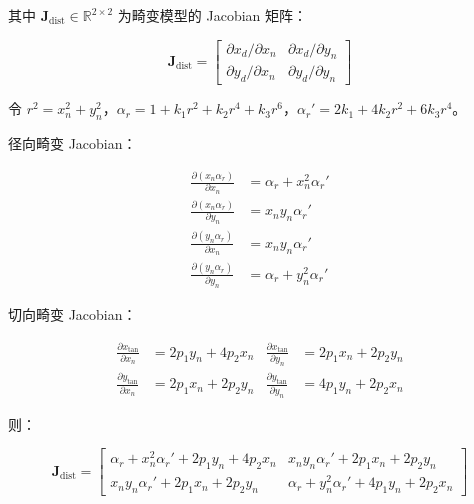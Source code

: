 \documentclass[12pt,a4paper]{article}
\begin{document}
其中 $\mathbf{J}_{\text{dist}} \in \mathbb{R}^{2 \times 2}$ 为畸变模型的 Jacobian 矩阵：

\begin{equation}
\mathbf{J}_{\text{dist}} =
\begin{bmatrix}
\partial x_d / \partial x_n & \partial x_d / \partial y_n \\
\partial y_d / \partial x_n & \partial y_d / \partial y_n
\end{bmatrix}
\label{eq:distortion_jacobian}
\end{equation}

令 $r^2 = x_n^2 + y_n^2$，$\alpha_r = 1 + k_1 r^2 + k_2 r^4 + k_3 r^6$，$\alpha_r' = 2k_1 + 4k_2 r^2 + 6k_3 r^4$。

径向畸变 Jacobian：

\begin{equation}
\begin{aligned}
\frac{\partial (x_n \alpha_r)}{\partial x_n} &= \alpha_r + x_n^2 \alpha_r' \\
\frac{\partial (x_n \alpha_r)}{\partial y_n} &= x_n y_n \alpha_r' \\
\frac{\partial (y_n \alpha_r)}{\partial x_n} &= x_n y_n \alpha_r' \\
\frac{\partial (y_n \alpha_r)}{\partial y_n} &= \alpha_r + y_n^2 \alpha_r'
\end{aligned}
\label{eq:radial_jacobian}
\end{equation}

切向畸变 Jacobian：

\begin{equation}
\begin{aligned}
\frac{\partial x_{\text{tan}}}{\partial x_n} &= 2p_1 y_n + 4p_2 x_n & \frac{\partial x_{\text{tan}}}{\partial y_n} &= 2p_1 x_n + 2p_2 y_n \\
\frac{\partial y_{\text{tan}}}{\partial x_n} &= 2p_1 x_n + 2p_2 y_n & \frac{\partial y_{\text{tan}}}{\partial y_n} &= 4p_1 y_n + 2p_2 x_n
\end{aligned}
\label{eq:tangential_jacobian}
\end{equation}

则：

\begin{equation}
\mathbf{J}_{\text{dist}} =
\begin{bmatrix}
\alpha_r + x_n^2 \alpha_r' + 2p_1 y_n + 4p_2 x_n & x_n y_n \alpha_r' + 2p_1 x_n + 2p_2 y_n \\[4pt]
x_n y_n \alpha_r' + 2p_1 x_n + 2p_2 y_n & \alpha_r + y_n^2 \alpha_r' + 4p_1 y_n + 2p_2 x_n
\end{bmatrix}
\label{eq:distortion_jacobian_full}
\end{equation}
\end{document}
